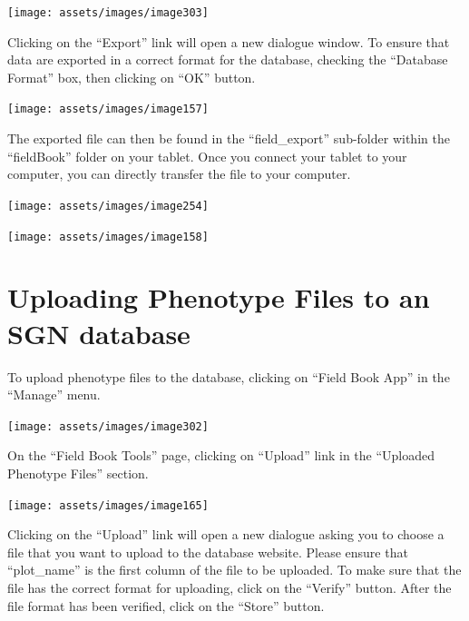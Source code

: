 \documentclass[
  12pt,
]{book}
\begin{document}
\begin{center}\texttt{[image: assets/images/image303]} \end{center}

Clicking on the ``Export'' link will open a new dialogue window. To ensure that data are exported in a correct format for the database, checking the ``Database Format'' box, then clicking on ``OK'' button.

\begin{center}\texttt{[image: assets/images/image157]} \end{center}

The exported file can then be found in the ``field\_export'' sub-folder within the ``fieldBook'' folder on your tablet. Once you connect your tablet to your computer, you can directly transfer the file to your computer.

\begin{center}\texttt{[image: assets/images/image254]} \end{center}

\begin{center}\texttt{[image: assets/images/image158]} \end{center}

\hypertarget{uploading-pheno-files}{%
\section{Uploading Phenotype Files to an SGN database}\label{uploading-pheno-files}}

To upload phenotype files to the database, clicking on ``Field Book App'' in the ``Manage'' menu.

\begin{center}\texttt{[image: assets/images/image302]} \end{center}

On the ``Field Book Tools'' page, clicking on ``Upload'' link in the ``Uploaded Phenotype Files'' section.

\begin{center}\texttt{[image: assets/images/image165]} \end{center}

Clicking on the ``Upload'' link will open a new dialogue asking you to choose a file that you want to upload to the database website. Please ensure that ``plot\_name'' is the first column of the file to be uploaded. To make sure that the file has the correct format for uploading, click on the ``Verify'' button. After the file format has been verified, click on the ``Store'' button.
\end{document}
